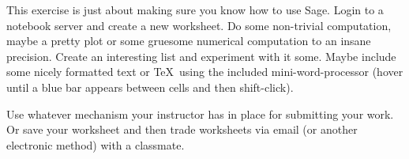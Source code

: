 \begin{sageverbatim}\end{sageverbatim}
%
%
This exercise is just about making sure you know how to use Sage.  Login to a notebook server and create a new worksheet.  Do some non-trivial computation, maybe a pretty plot or some gruesome numerical computation to an insane precision.   Create an interesting list and experiment with it some.  Maybe include some nicely formatted text or \TeX\ using the included mini-word-processor (hover until a blue bar appears between cells and then shift-click).\par
%
Use whatever mechanism your instructor has in place for submitting your work.  Or save your worksheet and then trade worksheets via email (or another electronic method) with a classmate.
\begin{sageverbatim}\end{sageverbatim}
%
